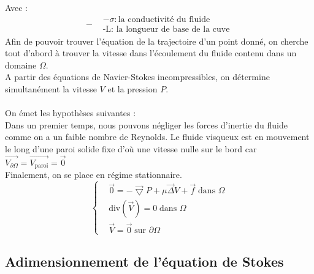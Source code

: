 \documentclass[a4paper,12pt,titlepage]{report}
\begin{document}
\begin{onehalfspace}
\begin{figure}[h]
\begin{center}
\caption{}
\label{figure 1}
\end{center}
\end{figure}
Avec :
\[-
\begin{aligned}
&-\sigma : \text{la conductivité du fluide }
\\%
&\text{-L: la longueur de base de la cuve}
\end{aligned}
\]
\normalsize 
Afin de pouvoir trouver l'équation de la trajectoire d’un point donné, on cherche tout d’abord à trouver la vitesse dans l'écoulement du fluide contenu dans un domaine $\Omega$.
\\A partir des équations de Navier-Stokes incompressibles, on détermine simultanément la vitesse  $V$ et la pression $P$. 
\\
\\
On émet les hypothèses suivantes :
\\
Dans un premier temps, nous pouvons négliger les forces d’inertie du fluide comme on a un faible nombre de Reynolds.
Le fluide visqueux est en mouvement le long d’une paroi solide fixe d’où une vitesse nulle sur le bord car 
$\vec{V_{\partial\Omega}}=\vec{V_{\text{paroi}}}=\vec{0}$
\\	
Finalement, on se place en régime stationnaire.
\begin{equation*}
  \left\{
    \begin{aligned}
      &\vec{0}=-\vec{\bigtriangledown}P +\mu\vec{\Delta}V +\vec{f}\;\text{dans }\Omega \\
      &\text{div}(\vec{V})=0\;\text{dans }\Omega \\     
      &\vec{V}=\vec{0}\;\text{sur }\partial\Omega
    \end{aligned}
  \right.
\end{equation*}


\subsection{Adimensionnement de l'équation de Stokes}


\end{onehalfspace}
\end{document}
